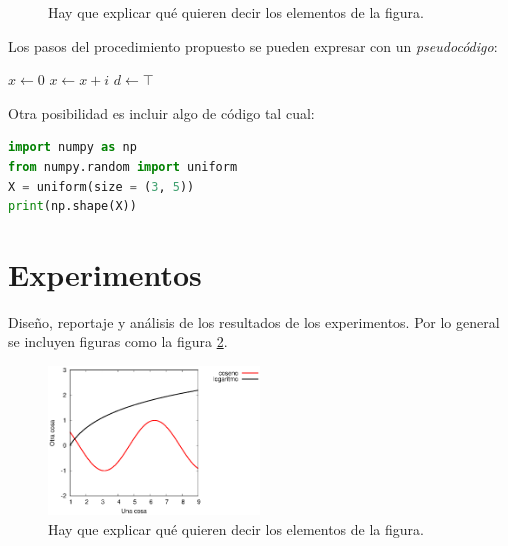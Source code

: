 \documentclass{sciposter}
\begin{document}
\begin{multicols}{2}
\begin{figure}
\captionsetup{type=figure} %
\setcounter{figure}{0} %
\begin{center}
\end{center}
\caption{Hay que explicar qué quieren decir los elementos de la figura.}
\label{diag}
\end{figure}

Los pasos del procedimiento propuesto se pueden expresar con un {\em pseudocódigo}:

\begin{algorithmic}[1]
\State $x \leftarrow 0$
	\State $x \leftarrow x + i$
\EndFor
{}
    \State $d \leftarrow \top$
\EndIf
\end{algorithmic} 

Otra posibilidad es incluir algo de código tal cual:
\begin{lstlisting}[language=Python, caption=Procedimiento del segundo paso]
import numpy as np
from numpy.random import uniform
X = uniform(size = (3, 5))
print(np.shape(X))
\end{lstlisting}

\section{Experimentos}

Diseño, reportaje y análisis de los resultados de los experimentos. Por lo general se incluyen figuras como la figura \ref{curvas}.

\begin{figure}
\setcounter{figure}{1} %
\captionsetup{type=figure} %
\begin{center}
   \includegraphics[width=0.5\textwidth]{curvas.eps}
   \end{center}
    \caption{Hay que explicar qué quieren decir los elementos de la figura.}
    \label{curvas}
\end{figure}


\end{multicols}
\end{document}
